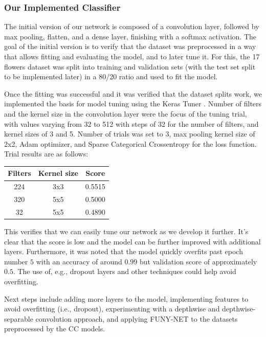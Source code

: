 \subsubsection{Our Implemented Classifier}
The initial version of our network is composed of a convolution layer, followed by max pooling, flatten, and a dense layer, finishing with a softmax activation.
The goal of the initial version is to verify that the dataset was preprocessed in a way that allows fitting and evaluating the model, and to later tune it.
For this, the 17 flowers dataset was split into training and validation sets (with the test set split to be implemented later) in a 80/20 ratio and used to fit the model.

Once the fitting was successful and it was verified that the dataset splits work, we implemented the basis for model tuning using the Keras Tuner \cite{omalley2019kerastuner}.
Number of filters and the kernel size in the convolution layer were the focus of the tuning trial, with values varying from 32 to 512 with steps of 32 for the number of filters, and kernel sizes of 3 and 5.
Number of trials was set to 3, max pooling kernel size of 2x2, Adam optimizer, and Sparse Categorical Crossentropy for the loss function. Trial results are as follows:

\begin{tabular}{c|c|c}
    Filters & Kernel size & Score  \\
    \hline
    \hline
    224     & 3x3         & 0.5515 \\
    \hline
    320     & 5x5         & 0.5000 \\
    \hline
    32      & 5x5         & 0.4890
\end{tabular}

This verifies that we can easily tune our network as we develop it further. It's clear that the score is low and the model can be further improved with additional layers.
Furthermore, it was noted that the model quickly overfits past epoch number $5$ with an accuracy of around $0.99$ but validation score of approximately $0.5$.
The use of, e.g., dropout layers and other techniques could help avoid overfitting.

Next steps include adding more layers to the model, implementing features to avoid overfitting (i.e., dropout), experimenting with a depthwise and depthwise-separable convolution approach, and applying FUNY-NET to the datasets preprocessed by the CC models.